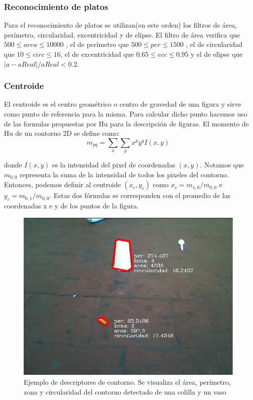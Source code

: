 	\subsubsection{Reconocimiento de platos}
	Para el reconocimiento de platos se utilizan(en este orden) los filtros de área, perímetro, circularidad, excentricidad y de elipse.
	El filtro de área verifica que $500 \leq area \leq 10000 $ , el de perímetro que $500 \leq per \leq 1500 $ , el de circularidad
	que $10 \leq circ \leq 16$, el de excentricidad que $0.65 \leq ecc \leq 0.95$ y el de elipse que $|a-aReal|/ aReal < 0.2$.
	
	\subsubsection{Centroide}
	El centroide es el centro geométrico o centro de 
	gravedad de una figura y 
	sirve como punto de referencia para la misma. Para calcular dicho 
	punto hacemos uso de las formulas propuestas por Hu \cite{Hu1962} para la 
	descripción de figuras. El momento de Hu de un contorno 2D se define como:
	\begin{equation}
		m_{pq}=\sum_{x}{\sum_{y}{x^py^qI(x,y)}}
	\end{equation}
	
	donde $I(x,y)$ es la intensidad del pixel de coordenadas $(x,y)$.
	Notamos que $m_{0,0}$ representa la suma de la intensidad de todos los pixeles del 
	contorno. Entonces, podemos definir al centroide $(x_c,y_c)$ como 
	$x_c= m_{1,0} / m_{0,0}$ e 
	$y_c=m_{0,1} / m_{0,0}$. Estas dos fórmulas se corresponden con el 
	promedio de las coordenadas x e y de los puntos de la figura.  


\begin{figure}[tpb]
\begin{center}
  \includegraphics[scale=0.4]{figuras/filtros.png}
\end{center}
  \caption{\small Ejemplo de descriptores de contorno. Se visualiza el área, perímetro, zona y circularidad del contorno 
  detectado de una colilla y un vaso}
  \label{fig:desc}
\end{figure}

